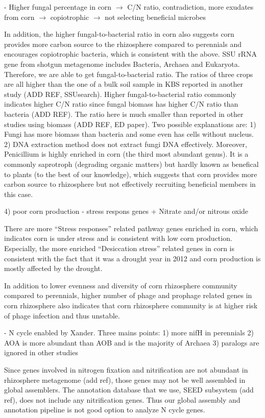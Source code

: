 \documentclass[12pt]{article}
\begin{document}
- Higher fungal percentage in corn $\rightarrow$ C/N ratio, contradiction, more exudates from corn $\rightarrow$ copiotrophic $\rightarrow$ not selecting beneficial microbes

In addition, the higher fungal-to-bacterial ratio in corn also suggests corn provides more carbon source to the rhizosphere compared to perennials and encourages copiotrophic bacteria, which is consistent with the above. SSU rRNA gene from shotgun metagenome includes Bacteria, Archaea and Eukaryota. Therefore, we are able to get fungal-to-bacterial ratio. The ratios of three crops are all higher than the one of a bulk soil sample in KBS reported in another study (ADD REF, SSUsearch). Higher fungal-to-bacterial ratio commonly indicates higher C/N ratio since fungal biomass has higher C/N ratio than bacteria (ADD REF). The ratio here is much smaller than reported in other studies using biomass (ADD REF, ED paper). Two possible explanations are: 1) Fungi has more biomass than bacteria and some even has cells without nucleus. 2) DNA extraction method does not extract fungi DNA effectively. Moreover, Penicillium is highly enriched in corn (the third most abundant genus). It is a commonly saprotroph (degrading organic matters) but hardly known as benefical to plants (to the best of our knowledge), which suggests that corn provides more carbon source to rhizosphere but not effectively recruiting beneficial members in this case.

4) poor corn production - stress respons genes + Nitrate and/or nitrous oxide

There are more ``Stress responses'' related pathway genes enriched in corn, which indicates corn is under stress and is consistent with low corn production. Especially, the more enriched ``Desiccation stress'' related genes in corn is consistent with the fact that it was a drought year in 2012 and corn production is mostly affected by the drought. 

In addition to lower evenness and diversity of corn rhizosphere community compared to perennials, higher number of phage and prophage related genes in corn rhizosphere also indicates that corn rhizosphere community is at higher risk of phage infection and thus unstable.

- N cycle enabled by Xander. Three mains points: 1) more nifH in perennials 2) AOA is more abundant than AOB and is the majority of Archaea 3) paralogs are ignored in other studies

Since genes involved in nitrogen fixation and nitrification are not abundant in rhizosphere metagenome (add ref), those genes may not be well assembled in global assemblers. The annotation database that we use, SEED subsystem (add ref), does not include any nitrification genes. Thus our global assembly and annotation pipeline is not good option to analyze N cycle genes.
\end{document}
